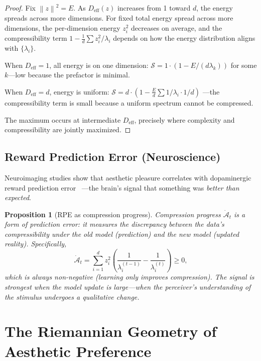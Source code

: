 \documentclass[journal]{IEEEtran}
\newtheorem{proposition}[theorem]{Proposition}
\newcommand{\norm}[1]{\left\lVert #1 \right\rVert}
\begin{document}
\begin{proof}
Fix $\norm{z}^2 = E$.  As $D_{\mathrm{eff}}(z)$ increases from 1
toward $d$, the energy spreads across more dimensions.  For fixed
total energy spread across more dimensions, the per-dimension energy
$z_i^2$ decreases on average, and the compressibility term
$1 - \frac{1}{d}\sum z_i^2/\lambda_i$ depends on how the energy
distribution aligns with $\{\lambda_i\}$.

When $D_{\mathrm{eff}} = 1$, all energy is on one dimension:
$\mathcal{S} = 1 \cdot (1 - E/(d\lambda_k))$ for some $k$---low
because the prefactor is minimal.

When $D_{\mathrm{eff}} = d$, energy is uniform:
$\mathcal{S} = d \cdot (1 - \frac{E}{d}\sum 1/\lambda_i \cdot 1/d)$
---the compressibility term is small because a uniform spectrum cannot
be compressed.

The maximum occurs at intermediate $D_{\mathrm{eff}}$, precisely
where complexity and compressibility are jointly maximized.
\end{proof}

\subsection{Reward Prediction Error (Neuroscience)}

Neuroimaging studies show that aesthetic pleasure correlates with
dopaminergic reward prediction error~\cite{salimpoor2011anatomically}
---the brain's signal that something was \emph{better than expected}.

\begin{proposition}[RPE as compression progress]
\label{prop:rpe}
Compression progress $\dot{\mathcal{A}}_t$ is a form of prediction
error: it measures the discrepancy between the data's compressibility
under the old model (prediction) and the new model (updated reality).
Specifically,
\begin{equation}
    \dot{\mathcal{A}}_t = \sum_{i=1}^d z_i^2 \left(
    \frac{1}{\lambda_i^{(t-1)}} - \frac{1}{\lambda_i^{(t)}}\right)
    \geq 0,
\end{equation}
which is always non-negative (learning only improves compression).
The signal is strongest when the model update is large---when
the perceiver's understanding of the stimulus undergoes a
qualitative change.
\end{proposition}


\section{The Riemannian Geometry of Aesthetic Preference}
\label{sec:riemannian}
\end{document}
